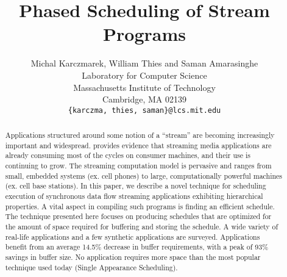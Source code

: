 \documentclass[runningheads,roman]{sig-alt-full}
\title{Phased Scheduling of Stream Programs}
\author{Michal Karczmarek, William Thies and Saman
Amarasinghe \\
Laboratory for Computer Science \\
        Massachusetts Institute of Technology \\
        Cambridge, MA  02139 \\
\texttt{\{karczma, thies, saman\}@lcs.mit.edu} \vspace{-24pt}}
\date{}
\begin{document}
\maketitle



\vspace{0.1in}

\begin{abstract}
Applications structured around some notion of a ``stream'' are
becoming increasingly important and widespread. \cite{Rix98}
provides evidence that streaming media applications are already
consuming most of the cycles on consumer machines, and their use
is continuing to grow. The streaming computation model is
pervasive and ranges from small, embedded systems (ex. cell
phones) to large, computationally powerful machines (ex. cell base
stations). In this paper, we describe a novel technique for
scheduling execution of synchronous data flow streaming
applications exhibiting hierarchical properties. A vital aspect in
compiling such programs is finding an efficient schedule. The
technique presented here focuses on producing schedules that are
optimized for the amount of space required for buffering and
storing the schedule. A wide variety of real-life applications and
a few synthetic applications are surveyed. Applications benefit
from an average 14.5\% decrease in buffer requirements, with a
peak of 93\% savings in buffer size. No application requires more
space than the most popular technique used today (Single
Appearance Scheduling).
\end{abstract}

%
%

%




%



%




\appendix


%
\end{document}
